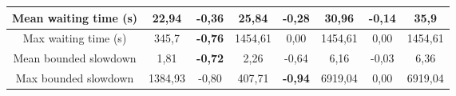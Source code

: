 \begin{table}[]
\begin{tabular}{cccccccc}
\multicolumn{1}{|c|}{Mean waiting time (s)}      & \multicolumn{1}{c|}{22,94}               & \multicolumn{1}{c|}{\textbf{-0,36}} & \multicolumn{1}{c|}{25,84}          & \multicolumn{1}{c|}{-0,28}          & \multicolumn{1}{c|}{30,96}          & \multicolumn{1}{c|}{-0,14}         & \multicolumn{1}{c|}{35,9}              \\ \hline
\multicolumn{1}{|c|}{Max waiting time (s)}       & \multicolumn{1}{c|}{345,7}               & \multicolumn{1}{c|}{\textbf{-0,76}} & \multicolumn{1}{c|}{1454,61}        & \multicolumn{1}{c|}{0,00}           & \multicolumn{1}{c|}{1454,61}        & \multicolumn{1}{c|}{0,00}          & \multicolumn{1}{c|}{1454,61}           \\ \hline
\multicolumn{1}{|c|}{Mean bounded slowdown}      & \multicolumn{1}{c|}{1,81}                & \multicolumn{1}{c|}{\textbf{-0,72}} & \multicolumn{1}{c|}{2,26}           & \multicolumn{1}{c|}{-0,64}          & \multicolumn{1}{c|}{6,16}           & \multicolumn{1}{c|}{-0,03}         & \multicolumn{1}{c|}{6,36}              \\ \hline
\multicolumn{1}{|c|}{Max bounded slowdown}       & \multicolumn{1}{c|}{1384,93}             & \multicolumn{1}{c|}{-0,80}          & \multicolumn{1}{c|}{407,71}         & \multicolumn{1}{c|}{\textbf{-0,94}} & \multicolumn{1}{c|}{6919,04}        & \multicolumn{1}{c|}{0,00}          & \multicolumn{1}{c|}{6919,04}           \\ \hline
\end{tabular}
\end{table}

